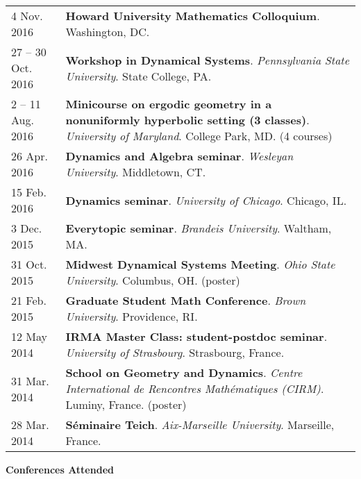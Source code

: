 \begin{center}
{\begin{longtable}{p{}  p{}}
4 Nov.  2016 & \textbf{Howard University Mathematics Colloquium}.  Washington, DC.  \\ 
27  -- 30 Oct.  2016 & \textbf{Workshop in Dynamical Systems}. \textit{Pennsylvania State University}.  State College, PA.  \\ 
2  -- 11 Aug.  2016 & \textbf{Minicourse on ergodic geometry in a nonuniformly hyperbolic setting (3 classes)}. \textit{University of Maryland}.  College Park, MD. (4 courses) \\ 
26 Apr.  2016 & \textbf{Dynamics and Algebra seminar}. \textit{Wesleyan University}.  Middletown, CT.  \\ 
15 Feb.  2016 & \textbf{Dynamics seminar}. \textit{University of Chicago}.  Chicago, IL.  \\ 
3 Dec.  2015 & \textbf{Everytopic seminar}. \textit{Brandeis University}.  Waltham, MA.  \\ 
31 Oct.  2015 & \textbf{Midwest Dynamical Systems Meeting}. \textit{Ohio State University}.  Columbus, OH. (poster) \\ 
21 Feb.  2015 & \textbf{Graduate Student Math Conference}. \textit{Brown University}.  Providence, RI.  \\ 
12 May  2014 & \textbf{IRMA Master Class: student-postdoc seminar}. \textit{University of Strasbourg}.  Strasbourg, France.  \\ 
31 Mar.  2014 & \textbf{School on Geometry and Dynamics}. \textit{Centre International de Rencontres Math\'ematiques (CIRM)}.  Luminy, France. (poster) \\ 
28 Mar.  2014 & \textbf{S\'eminaire Teich}. \textit{Aix-Marseille University}.  Marseille, France.  
    \end{longtable}
    } 
    \end{center}

    \vspace{-1em}
    

    \textbf{\large Conferences Attended}
    
